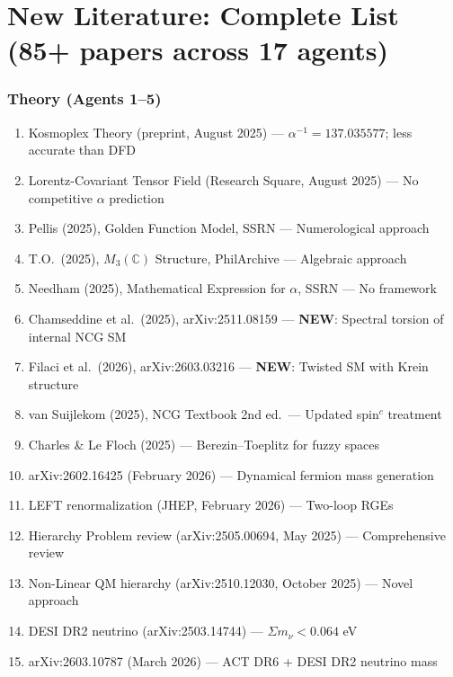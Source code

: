 \documentclass[11pt,a4paper]{article}
\newcommand{\NEW}{\textcolor{dfdblue}{\textbf{NEW}}}
\begin{document}
\part{New Literature: Complete List (85+ papers across 17 agents)}

\section{Theory (Agents 1--5)}

\begin{enumerate}
\item Kosmoplex Theory (preprint, August 2025) --- $\alpha^{-1} = 137.035577$; less accurate than DFD
\item Lorentz-Covariant Tensor Field (Research Square, August 2025) --- No competitive $\alpha$ prediction
\item Pellis (2025), Golden Function Model, SSRN --- Numerological approach
\item T.O.\ (2025), $M_3(\mathbb{C})$ Structure, PhilArchive --- Algebraic approach
\item Needham (2025), Mathematical Expression for $\alpha$, SSRN --- No framework
\item Chamseddine et al.\ (2025), arXiv:2511.08159 --- \NEW: Spectral torsion of internal NCG SM
\item Filaci et al.\ (2026), arXiv:2603.03216 --- \NEW: Twisted SM with Krein structure
\item van Suijlekom (2025), NCG Textbook 2nd ed.\ --- Updated spin$^c$ treatment
\item Charles \& Le Floch (2025) --- Berezin--Toeplitz for fuzzy spaces
\item arXiv:2602.16425 (February 2026) --- Dynamical fermion mass generation
\item LEFT renormalization (JHEP, February 2026) --- Two-loop RGEs
\item Hierarchy Problem review (arXiv:2505.00694, May 2025) --- Comprehensive review
\item Non-Linear QM hierarchy (arXiv:2510.12030, October 2025) --- Novel approach
\item DESI DR2 neutrino (arXiv:2503.14744) --- $\Sigma m_\nu < 0.064$ eV
\item arXiv:2603.10787 (March 2026) --- ACT DR6 + DESI DR2 neutrino mass
\end{enumerate}
\end{document}

